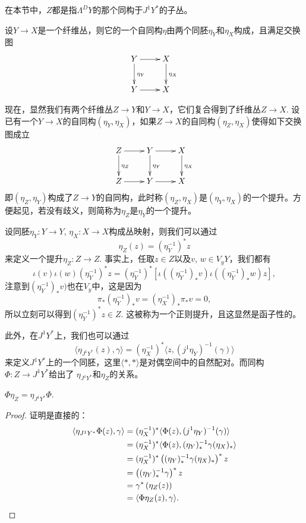 在本节中，$Z$都是指$\Lambda^{D}Y$的那个同构于$J^1Y^*$的子丛。

\begin{para}[纤维丛的自同构]
设$Y\to X$是一个纤维丛，则它的一个自同构$\eta$由两个同胚$\eta_Y$和$\eta_X$构成，且满足交换图
\[
    \xymatrix{
        Y \ar[r] \ar[d]^{\eta_Y} &X\ar[d]^{\eta_X}\\
        Y \ar[r] &X
    }
\]
\end{para}

现在，显然我们有两个纤维丛$Z\to Y$和$Y\to X$，它们复合得到了纤维丛$Z\to X$. 
设已有一个$Y\to X$的自同构$(\eta_Y,\eta_X)$，如果$Z\to X$的自同构$(\eta_Z,\eta_X)$使得如下交换图成立
\[
    \xymatrix{
        Z \ar[r] \ar[d]^{\eta_Z} &Y\ar[r]\ar[d]^{\eta_Y}&X\ar[d]^{\eta_X}\\
        Z \ar[r] &Y\ar[r]&X
    }
\]
即$(\eta_Z,\eta_Y)$构成了$Z\to Y$的自同构，此时称$(\eta_Z,\eta_X)$是$(\eta_Y,\eta_X)$的一个提升。方便起见，若没有歧义，则简称为$\eta_Z$是$\eta_Y$的一个提升。

\begin{para}[正则提升]
    设同胚$\eta_Y:Y\to Y$, $\eta_X:X\to X$构成丛映射，则我们可以通过
    \[
        \eta_Z (z)=(\eta_Y^{-1})^*z
    \]
    来定义一个提升$\eta_Z :Z\to Z$. 事实上，任取$z\in Z$以及$v$, $w\in V_yY$，我们都有
    \[
        \iota(v)\iota(w)(\eta_Y^{-1})^*z=(\eta_Y^{-1})^*\left[\iota((\eta_Y^{-1})_*v)\iota((\eta_Y^{-1})_*w)z\right],
    \]
    注意到$(\eta_Y^{-1})_*v)$也在$V_y$中，这是因为
    \[
        \pi_*(\eta_Y^{-1})_*v=(\eta_X^{-1})_*\pi_*v=0,
    \]
    所以立刻可以得到$(\eta_Y^{-1})^*z\in Z$. 这被称为一个正则提升，且这显然是函子性的。
\end{para}

此外，在$J^1Y^*$上，我们也可以通过
\begin{equation}\label{j1y*}
\langle \eta_{J^1Y^*}(z),\gamma\rangle=(\eta_{X}^{-1})^*\langle z,(j^1\eta_Y)^{-1}(\gamma)\rangle
\end{equation}
来定义$J^1Y^*$上的一个同胚，这里$\langle *,*\rangle$是对偶空间中的自然配对。而同构$\Phi:Z\to J^1Y^*$给出了
$\eta_{J^1Y^*}$和$\eta_Z$的关系。

\begin{lem}
$\Phi\eta_Z=\eta_{J^1Y^*}\Phi$.
\end{lem}

\begin{proof}
证明是直接的：
\begin{align*}
	\langle \eta_{J^1Y^*}\Phi (z),\gamma\rangle&=(\eta_{X}^{-1})^*\langle \Phi(z),(j^1\eta_Y)^{-1}(\gamma)\rangle\\
	&=(\eta_{X}^{-1})^*\langle \Phi(z),(\eta_Y)_*^{-1}\gamma(\eta_X)_*\rangle\\
	&=(\eta_{X}^{-1})^*\left((\eta_Y)_*^{-1}\gamma(\eta_X)_*\right)^*z\\
	&=\left((\eta_Y)_*^{-1}\gamma\right)^*z\\
	&=\gamma^*\left(\eta_Z(z)\right)\\
	&=\langle \Phi\eta_Z(z),\gamma\rangle.\qedhere
\end{align*}
\end{proof}

